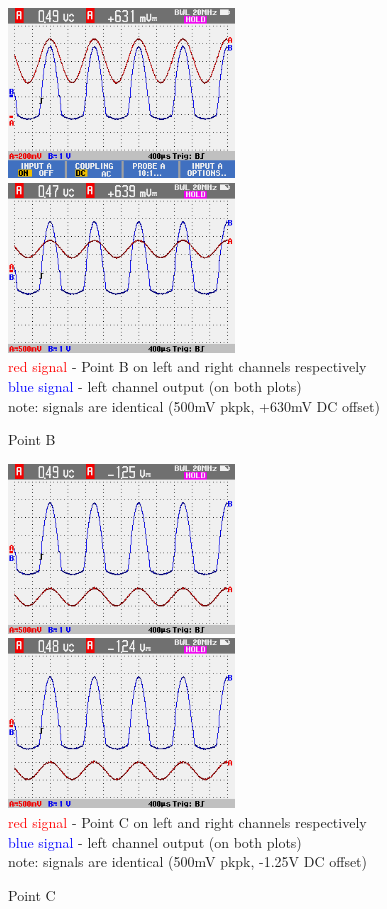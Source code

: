 \documentclass[a4paper,twoside]{report}
\begin{document}
\begin{figure}[hptb!]
    \centering
    \includegraphics[width=6cm]{img_report/left_point_B.png}
    \includegraphics[width=6cm]{img_report/right_point_B.png} \\ 
    \textcolor{Red}{red signal} - Point B on left and right channels respectively \\
    \textcolor{Blue}{blue signal} - left channel output (on both plots) \\
    note: signals are identical (500mV pkpk, +630mV DC offset)
 \caption{Point B}
 \label{fig:point-B}
\end{figure}

\begin{figure}[hptb!]
    \centering
    \includegraphics[width=6cm]{img_report/left_point_C.png}
    \includegraphics[width=6cm]{img_report/right_point_C.png} \\ 
    \textcolor{Red}{red signal} - Point C on left and right channels respectively \\
    \textcolor{Blue}{blue signal} - left channel output (on both plots) \\
    note: signals are identical (500mV pkpk, -1.25V DC offset)
 \caption{Point C}
 \label{fig:point-C}
\end{figure}
\end{document}
